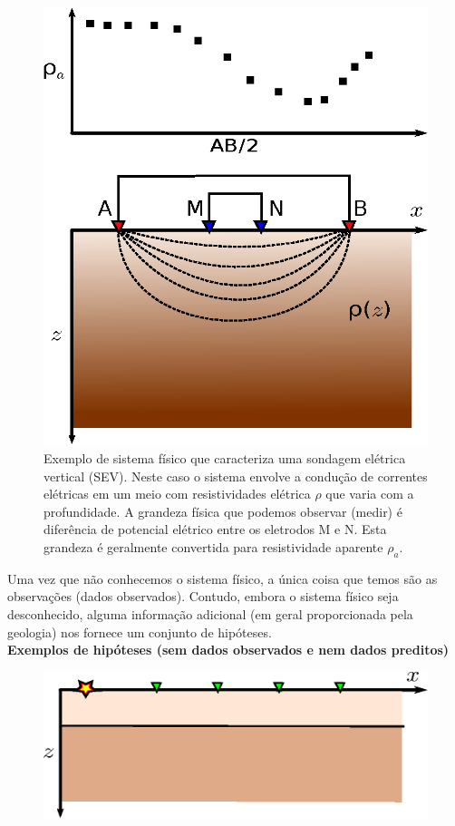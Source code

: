 \begin{figure}
    \centering
    \includegraphics[scale=1]{../figs/system-sev.eps}
    \caption{Exemplo de sistema físico que caracteriza uma sondagem elétrica
        vertical (SEV). Neste caso o sistema envolve a condução de correntes
        elétricas em um meio com resistividades elétrica $\rho$ que varia com
        a profundidade.
        A grandeza física que podemos observar (medir) é diferência de potencial
        elétrico entre os eletrodos M e N. Esta grandeza é geralmente convertida
        para resistividade aparente $\rho_a$.}
    \label{system-sev}
\end{figure}

\indent Uma vez que não conhecemos o sistema físico, a única coisa que temos são as
observações (dados observados). Contudo, embora o sistema físico seja
desconhecido, alguma informação adicional (em geral proporcionada pela geologia)
nos fornece um conjunto de hipóteses.
\\
{\bf Exemplos de hipóteses (sem dados observados e nem dados preditos)}

\begin{figure}
    \centering
    \includegraphics[scale=1]{../figs/hipotese-seismic.eps}
    \caption{}
    \label{hipotese-seismic}
\end{figure}

